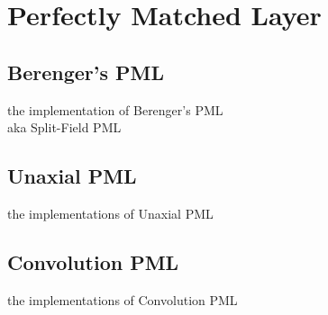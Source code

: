 \section{Perfectly Matched Layer}

\subsection{Berenger's PML}
the implementation of Berenger's PML\\

aka Split-Field PML
\subsection{Unaxial PML}
the implementations of Unaxial PML
\subsection{Convolution PML}
the implementations of Convolution PML
